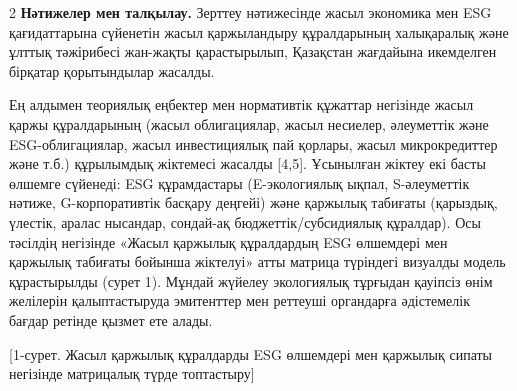 \begin{multicols}{2}
{\bfseries Нәтижелер мен талқылау.} Зерттеу нәтижесінде жасыл экономика мен
ESG қағидаттарына сүйенетін жасыл қаржыландыру құралдарының халықаралық
және ұлттық тәжірибесі жан-жақты қарастырылып, Қазақстан жағдайына
икемделген бірқатар қорытындылар жасалды.

Ең алдымен теориялық еңбектер мен нормативтік құжаттар негізінде жасыл
қаржы құралдарының (жасыл облигациялар, жасыл несиелер, әлеуметтік және
ESG-облигациялар, жасыл инвестициялық пай қорлары, жасыл микрокредиттер
және т.б.) құрылымдық жіктемесі жасалды {[}4,5{]}. Ұсынылған жіктеу екі
басты өлшемге сүйенеді: ESG құрамдастары (E-экологиялық ықпал,
S-әлеуметтік нәтиже, G-корпоративтік басқару деңгейі) және қаржылық
табиғаты (қарыздық, үлестік, аралас нысандар, сондай-ақ
бюджеттік/субсидиялық құралдар). Осы тәсілдің негізінде «Жасыл қаржылық
құралдардың ESG өлшемдері мен қаржылық табиғаты бойынша жіктелуі» атты
матрица түріндегі визуалды модель құрастырылды (сурет 1). Мұндай жүйелеу
экологиялық тұрғыдан қауіпсіз өнім желілерін қалыптастыруда эмитенттер
мен реттеуші органдарға әдістемелік бағдар ретінде қызмет ете алады.
\end{multicols}

[1-сурет. Жасыл қаржылық құралдарды ESG өлшемдері мен қаржылық
сипаты негізінде матрицалық түрде топтастыру]

